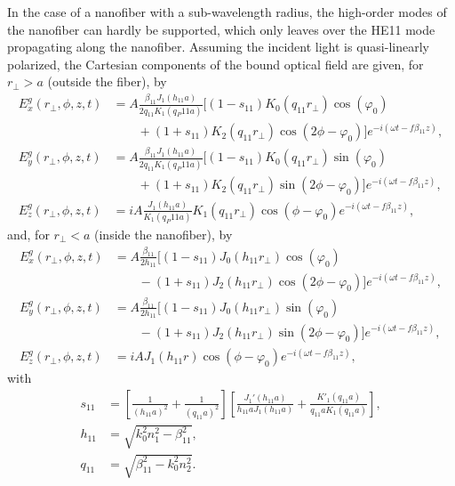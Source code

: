 \documentclass[]{report}
\begin{document}
In the case of a nanofiber with a sub-wavelength radius, the high-order modes of the nanofiber can hardly be supported, which only leaves over the HE11 mode propagating along the nanofiber. Assuming the incident light is quasi-linearly polarized, the Cartesian components of the bound optical field are given, for $ r_\perp>a $ (outside the fiber), by~\cite{Lacroute2012,LeKien2004}
\begin{subequations}
\label{Ertrga}
\begin{align}
E_x^g(r_\perp,\phi,z,t) &= A \frac{\beta_{11}J_1(h_{11}a)}{2q_{11}K_1(q_P{11}a)}[(1-s_{11})K_0(q_{11}r_\perp)\cos (\varphi_0) \nonumber\\
&\qquad + (1+s_{11})K_2 (q_{11}r_\perp) \cos (2\phi-\varphi_0) ] e^{-i(\omega t-f\beta_{11}z)},\\
E_y^g(r_\perp,\phi,z,t) &= A \frac{\beta_{11}J_1(h_{11}a)}{2q_{11}K_1(q_P{11}a)}[(1-s_{11})K_0(q_{11}r_\perp)\sin (\varphi_0) \nonumber\\
&\qquad + (1+s_{11})K_2 (q_{11}r_\perp) \sin (2\phi-\varphi_0) ] e^{-i(\omega t-f\beta_{11}z)},\\
E_z^g(r_\perp,\phi,z,t) &= iA \frac{J_1(h_{11}a)}{K_1(q_P{11}a)}K_1(q_{11}r_\perp)\cos (\phi-\varphi_0) e^{-i(\omega t-f\beta_{11}z)},
\end{align}
\end{subequations}
and, for $ r_\perp<a $ (inside the nanofiber), by
\begin{subequations}
\label{Ertrla}
\begin{align}
E_x^g(r_\perp,\phi,z,t) &= A \frac{\beta_{11}}{2h_{11}}[(1-s_{11})J_0(h_{11}r_\perp)\cos (\varphi_0) \nonumber\\
&\qquad - (1+s_{11})J_2 (h_{11}r_\perp) \cos (2\phi-\varphi_0) ] e^{-i(\omega t-f\beta_{11}z)},\\
E_y^g(r_\perp,\phi,z,t) &= A \frac{\beta_{11}}{2h_{11}}[(1-s_{11})J_0(h_{11}r_\perp)\sin (\varphi_0) \nonumber\\
&\qquad - (1+s_{11})J_2 (h_{11}r_\perp) \sin (2\phi-\varphi_0) ] e^{-i(\omega t-f\beta_{11}z)},\\
E_z^g(r_\perp,\phi,z,t) &= iA J_1(h_{11}r)\cos (\phi-\varphi_0) e^{-i(\omega t-f\beta_{11}z)},
\end{align}
\end{subequations}
with
\begin{subequations}
\begin{align}
s_{11} &= \left[\frac{1}{(h_{11}a)^2}+ \frac{1}{(q_{11}a)^2} \right] \left[ \frac{J_1'(h_{11}a)}{h_{11}aJ_1(h_{11}a)} + \frac{K'_1(q_{11}a)}{q_{11}aK_1(q_{11}a)} \right],\\
h_{11} &= \sqrt{k_0^2 n_1^2-\beta_{11}^2},\\
q_{11} &= \sqrt{\beta^2_{11}-k_0^2 n_2^2}.
\end{align}
\end{subequations}
\end{document}
